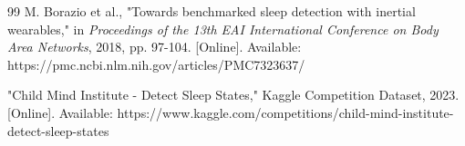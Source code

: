 \documentclass[conference]{IEEEtran}
\begin{document}
\begin{thebibliography}{
	99}
	M. Borazio et al., "Towards benchmarked sleep detection with inertial wearables," in \textit{Proceedings of the 13th EAI International Conference on Body Area Networks}, 2018, pp. 97-104. [Online]. Available: https://pmc.ncbi.nlm.nih.gov/articles/PMC7323637/

	"Child Mind Institute - Detect Sleep States," Kaggle Competition Dataset, 2023. [Online]. Available: https://www.kaggle.com/competitions/child-mind-institute-detect-sleep-states

\end{thebibliography}
\end{document}
